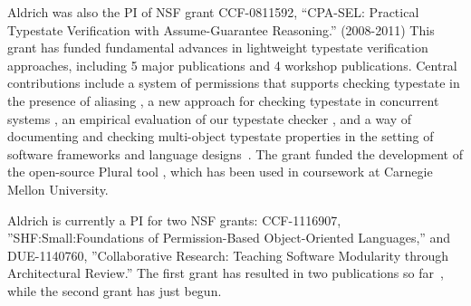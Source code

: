 \documentclass[10pt]{article}
\begin{document}
Aldrich was also the PI of NSF grant CCF-0811592, ``CPA-SEL: Practical
Typestate Verification with Assume-Guarantee Reasoning.'' (2008-2011)
This grant has funded fundamental advances in lightweight typestate
verification approaches, including 5 major publications and 4 workshop
publications.  Central contributions include a system of permissions
that supports checking typestate in the presence of aliasing
\cite{bierhoff09:thesis}, a new approach for checking typestate in
concurrent systems \cite{beckman08:verifying_atomic}, an empirical
evaluation of our typestate checker \cite{bierhoff09:plural}, and a
way of documenting and checking multi-object typestate properties in
the setting of software frameworks \cite{JA09} and language designs~\cite{aldrich11:plaid,sunshine11:plaid}. The grant funded the
development of the open-source Plural tool \cite{pluraltool}, which
has been used in coursework at Carnegie Mellon University.

Aldrich is currently a PI for two NSF grants: CCF-1116907, ''SHF:Small:Foundations of Permission-Based Object-Oriented Languages,'' and DUE-1140760, ''Collaborative Research: Teaching Software Modularity through Architectural Review.''  The first grant has resulted in two publications so far~\cite{naden12:borrowing,hannesPlural}, while the second grant has just begun.

\newpage

%
%

\setcounter{page}{1}
\renewcommand{\thepage}{References - \arabic{page}}



%
%
\end{document}
